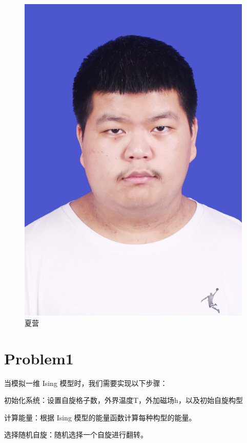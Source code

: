 \documentclass[UTF8]{ctexart}
\begin{document}
\begin{figure}[h]
        \begin{minipage}{0.32\textwidth}
            \centering
            \includegraphics[width=\linewidth]{xy}
            \caption{夏营}
            \label{fig:img3}
        \end{minipage}
    \end{figure}

    \section{Problem1}\label{sec:1}
    当模拟一维 Ising 模型时，我们需要实现以下步骤：

    初始化系统：设置自旋格子数，外界温度T，外加磁场h，以及初始自旋构型

    计算能量：根据 Ising 模型的能量函数计算每种构型的能量。

    选择随机自旋：随机选择一个自旋进行翻转。
\end{document}
